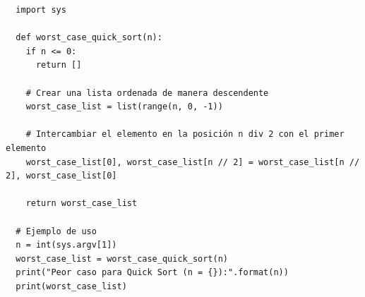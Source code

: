 \documentclass[answers, 10pt]{exam}
\begin{document}
\begin{questions}
\begin{solution}
\begin{enumerate}[(A)]
            \begin{verbatim}
  import sys

  def worst_case_quick_sort(n):
    if n <= 0:
      return []

    # Crear una lista ordenada de manera descendente
    worst_case_list = list(range(n, 0, -1))
    
    # Intercambiar el elemento en la posición n div 2 con el primer elemento
    worst_case_list[0], worst_case_list[n // 2] = worst_case_list[n // 2], worst_case_list[0]
    
    return worst_case_list

  # Ejemplo de uso
  n = int(sys.argv[1])
  worst_case_list = worst_case_quick_sort(n)
  print("Peor caso para Quick Sort (n = {}):".format(n))
  print(worst_case_list)

      \end{verbatim}
    \end{enumerate}

  \end{solution}


\end{questions}
\end{document}

